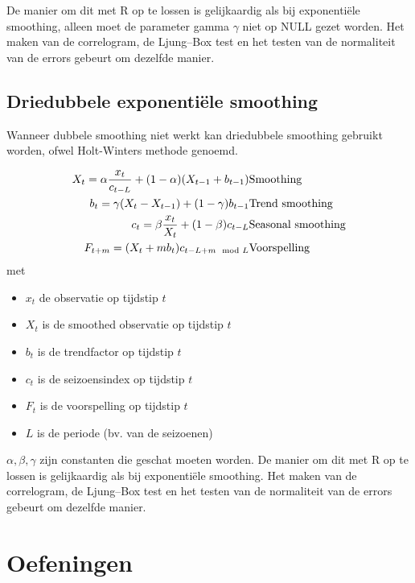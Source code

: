 De manier om dit met R op te lossen is gelijkaardig als bij exponenti\"ele smoothing, alleen moet de parameter gamma $\gamma$ niet op NULL gezet worden. Het maken van de correlogram, de Ljung–Box test en het testen van de normaliteit van de errors gebeurt om dezelfde manier. 

\subsection{Driedubbele exponenti\"ele smoothing}
Wanneer dubbele smoothing niet werkt kan driedubbele smoothing gebruikt worden, ofwel Holt-Winters methode genoemd.

\begin{eqnarray}
	X_{t} = \alpha \frac{x_{t}}{c_{t-L}} + (1-\alpha) (X_{t-1} + b_{t-1}) & \textnormal{Smoothing}\\
	b_{t} = \gamma (X_{t} - X_{t-1}) + (1-\gamma)b_{t-1} & \textnormal{Trend smoothing} \\
	c_{t} = \beta \frac{x_{t}}{X_{t}} + (1-\beta)c_{t-L} & \textnormal{Seasonal smoothing} \\
	F_{t+m} = (X_{t} + mb_{t})c_{t-L+m \mod L}  & \textnormal{Voorspelling}
\label{eq:HoltWinters}
\end{eqnarray}
 met 
\begin{itemize}
	\item $x_{t}$ de observatie op tijdstip $t$
	\item $X_{t}$ is de smoothed observatie op tijdstip $t$
	\item $b_{t}$ is de trendfactor op tijdstip $t$
	\item $c_{t}$ is de seizoensindex op tijdstip $t$
	\item $F_{t}$ is de voorspelling op tijdstip $t$
	\item $L$ is de periode (bv. van de seizoenen)
\end{itemize}

$\alpha, \beta, \gamma$ zijn constanten die geschat moeten worden. 
De manier om dit met R op te lossen is gelijkaardig als bij exponenti\"ele smoothing. Het maken van de correlogram, de Ljung–Box test en het testen van de normaliteit van de errors gebeurt om dezelfde manier. 

\section{Oefeningen}
\label{sec:tijdreeksen-oefeningen}

